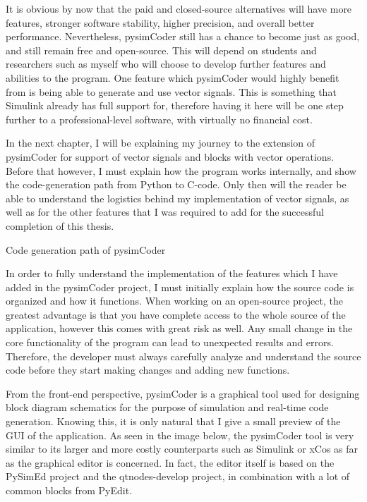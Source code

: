\quad It is obvious by now that the paid and closed-source alternatives will have more features, stronger software stability, higher
precision, and overall better performance. Nevertheless, pysimCoder still has a chance to become just as good, and still remain free
and open-source. This will depend on students and researchers such as myself who will choose to develop further features and
abilities to the program. One feature which pysimCoder would highly benefit from is being able to generate and use vector signals.
This is something that Simulink already has full support for, therefore having it here will be one step further to a 
professional-level software, with virtually no financial cost.

\quad In the next chapter, I will be explaining my journey to the extension of pysimCoder for support of vector
signals and blocks with vector operations. Before that however, I must explain how the program works internally, and show the 
code-generation path from Python to C-code. Only then will the reader be able to understand the logistics behind my implementation
of vector signals, as well as for the other features that I was required to add for the successful completion of this thesis.


\sec Code generation path of pysimCoder

\qquad In order to fully understand the implementation of the features which I have added in the pysimCoder project, 
I must initially explain how the source code is organized and how it functions. When working on an open-source project,
the greatest advantage is that you have complete access to the whole source of the application, however this comes 
with great risk as well. Any small change in the core functionality of the program can lead to unexpected results 
and errors. Therefore, the developer must always carefully analyze and understand the source code before they start 
making changes and adding new functions. 

\quad From the front-end perspective, pysimCoder is a graphical tool used for designing block diagram schematics 
for the purpose of simulation and real-time code generation. Knowing this, it is only natural that I give a small preview 
of the GUI of the application. As seen in the image below, the pysimCoder tool is very similar to its larger and more costly 
counterparts such as Simulink or xCos as far as the graphical editor is concerned. In fact, the editor itself is based on the 
PySimEd project and the qtnodes-develop project, in combination with a lot of common blocks from PyEdit. 
	
